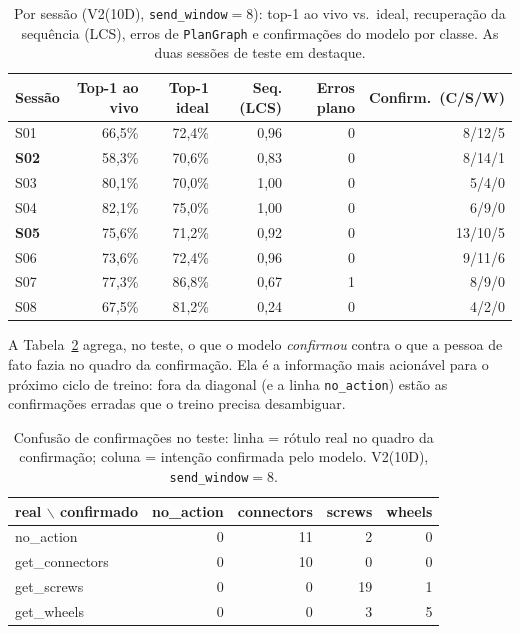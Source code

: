\documentclass[11pt]{article}
\begin{document}
\begin{table}[h]
\centering
\caption{Por sessão (V2(10D), \texttt{send\_window}$=8$): top-1 ao vivo vs.\
ideal, recuperação da sequência (LCS), erros de \texttt{PlanGraph} e
confirmações do modelo por classe. As duas sessões de teste em destaque.}
\label{tab:sessao}
\begin{tabular}{lrrrrr}
\toprule
Sessão & Top-1 ao vivo & Top-1 ideal & Seq. (LCS) & Erros plano & Confirm.\ (C/S/W) \\
\midrule
S01           & 66,5\% & 72,4\% & 0,96 & 0 & 8/12/5 \\
\textbf{S02}  & 58,3\% & 70,6\% & 0,83 & 0 & 8/14/1 \\
S03           & 80,1\% & 70,0\% & 1,00 & 0 & 5/4/0 \\
S04           & 82,1\% & 75,0\% & 1,00 & 0 & 6/9/0 \\
\textbf{S05}  & 75,6\% & 71,2\% & 0,92 & 0 & 13/10/5 \\
S06           & 73,6\% & 72,4\% & 0,96 & 0 & 9/11/6 \\
S07           & 77,3\% & 86,8\% & 0,67 & 1 & 8/9/0 \\
S08           & 67,5\% & 81,2\% & 0,24 & 0 & 4/2/0 \\
\bottomrule
\end{tabular}
\end{table}

A Tabela~\ref{tab:confconf} agrega, no teste, o que o modelo \emph{confirmou}
contra o que a pessoa de fato fazia no quadro da confirmação. Ela é a informação
mais acionável para o próximo ciclo de treino: fora da diagonal (e a linha
\texttt{no\_action}) estão as confirmações erradas que o treino precisa
desambiguar.

\begin{table}[h]
\centering
\caption{Confusão de confirmações no teste: linha = rótulo real no quadro da
confirmação; coluna = intenção confirmada pelo modelo. V2(10D),
\texttt{send\_window}$=8$.}
\label{tab:confconf}
\begin{tabular}{lrrrr}
\toprule
real $\backslash$ confirmado & no\_action & connectors & screws & wheels \\
\midrule
no\_action     & 0 & 11 & 2  & 0 \\
get\_connectors & 0 & 10 & 0  & 0 \\
get\_screws     & 0 & 0  & 19 & 1 \\
get\_wheels     & 0 & 0  & 3  & 5 \\
\bottomrule
\end{tabular}
\end{table}
\end{document}
